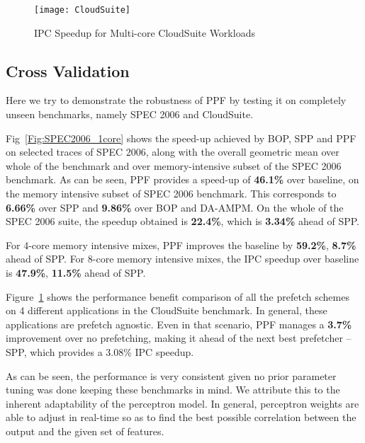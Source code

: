 \begin{figure}[ht]
\texttt{[image: CloudSuite]}
\caption{IPC Speedup for Multi-core CloudSuite Workloads}
\label{Fig:CloudSuite}
\end{figure}

\subsection{Cross Validation}
\label{Results-CrossVal}

Here we try to demonstrate the robustness of PPF by testing it on
completely unseen benchmarks, namely SPEC 2006 and CloudSuite.

Fig~\ref{Fig:SPEC2006_1core} shows the speed-up achieved by BOP, SPP and PPF on
selected traces of SPEC 2006, along with the overall geometric mean
over whole of the benchmark and over memory-intensive subset of the
SPEC 2006 benchmark.  As can be seen, PPF provides a speed-up of
\textbf{46.1\%} over baseline, on the memory intensive subset of SPEC 2006
benchmark. This corresponds to \textbf{6.66\%} over SPP and \textbf{9.86\%} over BOP and DA-AMPM.  
On the whole of the SPEC 2006 suite, the speedup obtained is \textbf{22.4\%},
which is \textbf{3.34\%} ahead of SPP.

For 4-core memory intensive mixes, PPF improves the baseline by \textbf{59.2\%}, 
\textbf{8.7\%} ahead of SPP. For 8-core memory intensive mixes, the IPC speedup 
over baseline is \textbf{47.9\%}, \textbf{11.5\%} ahead of SPP. 

Figure~\ref{Fig:CloudSuite} shows the performance benefit comparison of all 
the prefetch schemes on 4 different applications in the CloudSuite benchmark. 
In general, these applications are prefetch agnostic. Even in that scenario, 
PPF manages a \textbf{3.7\%} improvement over no prefetching, making it ahead of the 
next best prefetcher -- SPP, which provides a 3.08\% IPC speedup.

As can be seen, the performance is very consistent given no prior
parameter tuning was done keeping these benchmarks in mind.  We attribute
this to the inherent adaptability of the perceptron model.  In
general, perceptron weights are able to adjust in real-time so as to
find the best possible correlation between the output and the given set of 
features.
